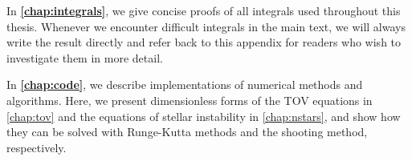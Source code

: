 In \textbf{\cref{chap:integrals}}, we give concise proofs of all integrals used throughout this thesis.
Whenever we encounter difficult integrals in the main text, we will always write the result directly and refer back to this appendix for readers who wish to investigate them in more detail.

In \textbf{\cref{chap:code}}, we describe implementations of numerical methods and algorithms.
Here, we present dimensionless forms of the TOV equations in \cref{chap:tov} and the equations of stellar instability in \cref{chap:nstars}, and show how they can be solved with Runge-Kutta methods and the shooting method, respectively.
